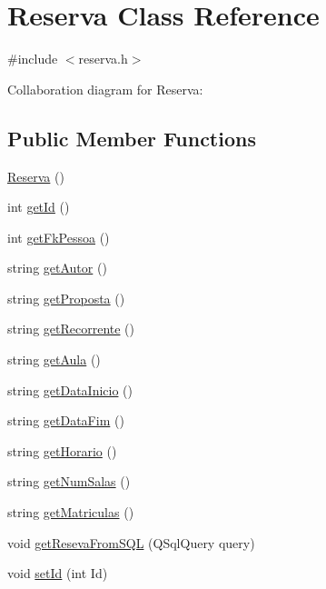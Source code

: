 \hypertarget{classReserva}{}\section{Reserva Class Reference}
\label{classReserva}


{\ttfamily \#include $<$reserva.\+h$>$}



Collaboration diagram for Reserva\+:
\subsection*{Public Member Functions}
\begin{DoxyCompactItemize}
\item 
\hyperlink{classReserva_a0738e74ff413ed13f9a141c5dae3d0bb}{Reserva} ()
\item 
int \hyperlink{classReserva_a6e90071312a47a673eb9736bcc67ba7f}{get\+Id} ()
\item 
int \hyperlink{classReserva_ad6d72c1760ec4dc706314b130219c89f}{get\+Fk\+Pessoa} ()
\item 
string \hyperlink{classReserva_a54f140654be883031b7fd8160f68a35c}{get\+Autor} ()
\item 
string \hyperlink{classReserva_ab23536cc59e32abb7d0fda451c0f52d7}{get\+Proposta} ()
\item 
string \hyperlink{classReserva_ab26299673227e608110f6e536d630473}{get\+Recorrente} ()
\item 
string \hyperlink{classReserva_a1eccd1a6a33e6e5e01c1a4a28081fa98}{get\+Aula} ()
\item 
string \hyperlink{classReserva_a8be3d70c1a595d24d554bfaab7257dfc}{get\+Data\+Inicio} ()
\item 
string \hyperlink{classReserva_a7a982974a389be9f8868c69c570054b9}{get\+Data\+Fim} ()
\item 
string \hyperlink{classReserva_a907b1b157f4b06a624577758cdc7b58e}{get\+Horario} ()
\item 
string \hyperlink{classReserva_a3e6baf3f88854ebe88b6b209251035a5}{get\+Num\+Salas} ()
\item 
string \hyperlink{classReserva_af8e7342afcd96c86a1009a1e79a3da9e}{get\+Matriculas} ()
\item 
void \hyperlink{classReserva_ad93b65c5d99d548abda549959005141e}{get\+Reseva\+From\+S\+QL} (Q\+Sql\+Query query)
\item 
void \hyperlink{classReserva_a1f4a3a241ac2c88ba4fa12bb9e6a3a2d}{set\+Id} (int Id)
\item 

\end{DoxyCompactItemize}
